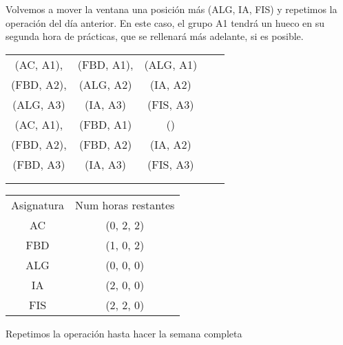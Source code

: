 Volvemos a mover la ventana una posición más (ALG, IA, FIS) y repetimos la operación del día anterior. En este caso, el grupo A1 tendrá un hueco en su segunda hora de prácticas, que se rellenará más adelante, si es posible.

\begin{minipage}{0.7\textwidth}    
\begin{tabular}{| c | c | c | c | c |}
\hline
 (AC, A1), & (FBD, A1), & (ALG, A1) &  & \\
 (FBD, A2), & (ALG, A2) & (IA, A2) &  & \\
 (ALG, A3) &  (IA, A3) & (FIS, A3) &  & \\
 \hline
 (AC, A1), & (FBD, A1) & () &  & \\
 (FBD, A2), & (FBD, A2) & (IA, A2) &  & \\
 (FBD, A3) & (IA, A3) & (FIS, A3) &  & \\
 \hline
 &  &  &  & \\
 \hline
 &  &  &  & \\
 \hline 
\end{tabular}
\end{minipage}
\begin{minipage}{0.8\textwidth}
\begin{tabular}{c | c}
Asignatura & Num horas restantes \\
AC & (0, 2, 2) \\
FBD & (1, 0, 2) \\
ALG & (0, 0, 0) \\
IA & (2, 0, 0) \\
FIS & (2, 2, 0)
\end{tabular}
\end{minipage}

Repetimos la operación hasta hacer la semana completa


